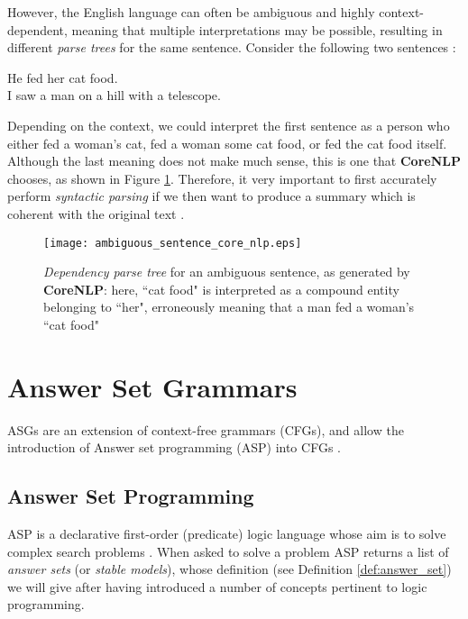 \noindent
However, the English language can often be ambiguous and highly context-dependent, meaning that multiple interpretations may be possible, resulting in different \textit{parse trees} for the same sentence. Consider the following two sentences \cite{noauthor_studying_nodate}:

\begin{displayquote}
He fed her cat food. \\
I saw a man on a hill with a telescope.
\end{displayquote}

\noindent
Depending on the context, we could interpret the first sentence as a person who either fed a woman's cat, fed a woman some cat food, or fed the cat food itself. Although the last meaning does not make much sense, this is one that \textbf{CoreNLP} chooses, as shown in Figure \ref{fig:dependency_tree_ambiguous_sentence}. Therefore, it very important to first accurately perform \textit{syntactic parsing} if we then want to produce a summary which is coherent with the original text \cite{gomez-rodriguez_how_2019}.

\begin{figure}[H]
\centering
\texttt{[image: ambiguous\_sentence\_core\_nlp.eps]}
\caption{\textit{Dependency parse tree} for an ambiguous sentence, as generated by  \textbf{CoreNLP}: here, ``cat food" is interpreted as a compound entity belonging to ``her", erroneously meaning that a man fed a woman's ``cat food"}
\label{fig:dependency_tree_ambiguous_sentence}
\end{figure}

\section{Answer Set Grammars}
\label{sec:asg}

ASGs are an extension of context-free grammars (CFGs), and allow the introduction of Answer set programming (ASP) into CFGs \cite{law_representing_2019}.

\subsection{Answer Set Programming}

ASP is a declarative first-order (predicate) logic language whose aim is to solve complex search problems \cite{lifschitz_what_nodate}. When asked to solve a problem ASP returns a list of \textit{answer sets} (or \textit{stable models}), whose definition (see Definition \ref{def:answer_set}) we will give after having introduced a number of concepts pertinent to logic programming.

